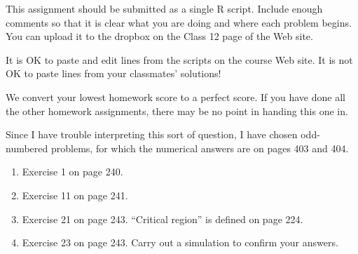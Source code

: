 \documentclass[12pt]{article}
\begin{document}
This assignment should be submitted as a single R script. Include enough comments so that it is clear what you are doing and where each problem begins. You can upload it to the dropbox on the Class 12 page of the Web site. 

It is OK to paste and edit lines from the scripts on the course Web site. It is not OK to paste lines from your classmates' solutions!

We convert your lowest homework score to a perfect score. If you have done all the other homework assignments, there may be no point in handing this one in.

Since I have trouble interpreting this sort of question, I have chosen odd-numbered problems, for which the numerical answers are on pages 403 and 404. 

\begin{enumerate}
\item Exercise 1 on page 240.

\item Exercise 11 on page 241.

\item Exercise 21 on page 243. ``Critical region'' is defined on page 224.

\item Exercise 23 on page 243. Carry out a simulation to confirm your answers.


\end{enumerate}









\pagebreak
\end{document}
